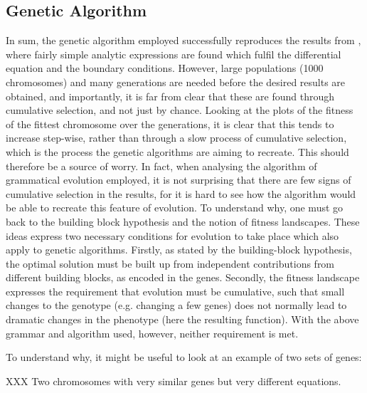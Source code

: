 \documentclass[multicolumn, 12pt]{extarticle}
\begin{document}
\subsection{Genetic Algorithm}
In sum, the genetic algorithm employed successfully reproduces the results from \cite{Lagaris}, where fairly simple analytic expressions are found which fulfil the differential equation and the boundary conditions. However, large populations (1000 chromosomes) and many generations are needed before the desired results are obtained, and importantly, it is far from clear that these are found through cumulative selection, and not just by chance. Looking at the plots of the fitness of the fittest chromosome over the generations, it is clear that this tends to increase step-wise, rather than through a slow process of cumulative selection, which is the process the genetic algorithms are aiming to recreate. This should therefore be a source of worry. In fact, when analysing the algorithm of grammatical evolution employed, it is not surprising that there are few signs of cumulative selection in the results, for it is hard to see how the algorithm would be able to recreate this feature of evolution. To understand why, one must go back to the building block hypothesis and the notion of fitness landscapes. These ideas express two necessary conditions for evolution to take place which also apply to genetic algorithms. Firstly, as stated by the building-block hypothesis, the optimal solution must be built up from independent contributions from different building blocks, as encoded in the genes. Secondly, the fitness landscape expresses the requirement that evolution must be cumulative, such that small changes to the genotype (e.g. changing a few genes) does not normally lead to dramatic changes in the phenotype (here the resulting function). With the above grammar and algorithm used, however, neither requirement is met. 

To understand why, it might be useful to look at an example of two sets of genes:

XXX Two chromosomes with very similar genes but very different equations. 
\end{document}
